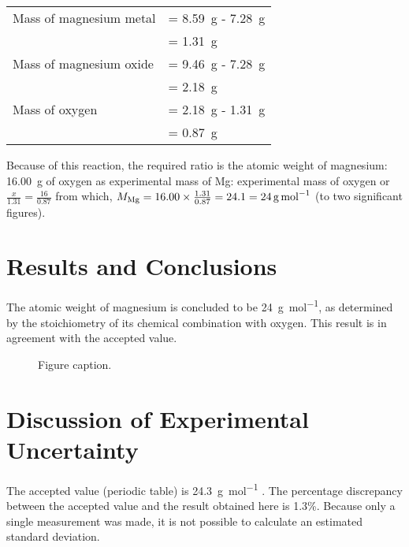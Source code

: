 \documentclass{article}
\begin{document}
\begin{tabular}{ll}
Mass of magnesium metal & = \SI{8.59}{\gram} - \SI{7.28}{\gram}\\
& = \SI{1.31}{\gram}\\
Mass of magnesium oxide & = \SI{9.46}{\gram} - \SI{7.28}{\gram}\\
& = \SI{2.18}{\gram}\\
Mass of oxygen & = \SI{2.18}{\gram} - \SI{1.31}{\gram}\\
& = \SI{0.87}{\gram}
\end{tabular}

Because of this reaction, the required ratio is the atomic weight of magnesium: \SI{16.00}{\gram} of oxygen as experimental mass of Mg: experimental mass of oxygen or $\frac{x}{1.31}=\frac{16}{0.87}$ from which, $M_{\ce{Mg}} = 16.00 \times \frac{1.31}{0.87} = 24.1 = \SI{24}{\gram\per\mole}$ (to two significant figures).


\section{Results and Conclusions}

The atomic weight of magnesium is concluded to be \SI{24}{\gram\per\mol}, as determined by the stoichiometry of its chemical combination with oxygen. This result is in agreement with the accepted value.

\begin{figure}[h]
\begin{center}

\caption{Figure caption.}
\end{center}
\end{figure}


\section{Discussion of Experimental Uncertainty}

The accepted value (periodic table) is \SI{24.3}{\gram\per\mole} \cite{Smith:2012qr}. The percentage discrepancy between the accepted value and the result obtained here is 1.3\%. Because only a single measurement was made, it is not possible to calculate an estimated standard deviation.
\end{document}
